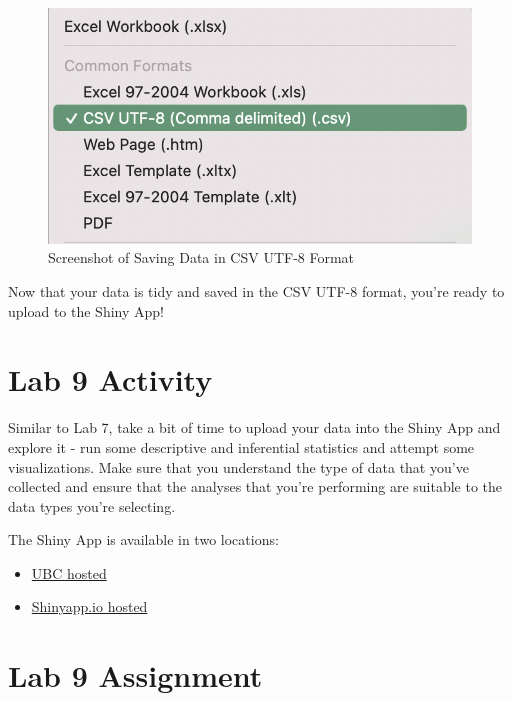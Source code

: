 \documentclass[
]{book}
\providecommand{\tightlist}{%
  \setlength{\itemsep}{0pt}\setlength{\parskip}{0pt}}
\begin{document}
\begin{figure}
\centering
\includegraphics{figures_images/csv-UTF8.png}
\caption{Screenshot of Saving Data in CSV UTF-8 Format}
\end{figure}

Now that your data is tidy and saved in the CSV UTF-8 format, you're ready to upload to the Shiny App!

\hypertarget{lab-9-activity}{%
\chapter*{Lab 9 Activity}\label{lab-9-activity}}

Similar to Lab 7, take a bit of time to upload your data into the Shiny App and explore it - run some descriptive and inferential statistics and attempt some visualizations. Make sure that you understand the type of data that you've collected and ensure that the analyses that you're performing are suitable to the data types you're selecting.

The Shiny App is available in two locations:

\begin{itemize}
\tightlist
\item
  \href{https://openscience.ok.ubc.ca/shiny/BIOL-116/}{UBC hosted}
\item
  \href{https://ubco-biology.shinyapps.io/biol-116/}{Shinyapp.io hosted}
\end{itemize}

\hypertarget{lab-9-assignment}{%
\chapter*{Lab 9 Assignment}\label{lab-9-assignment}}
\end{document}
